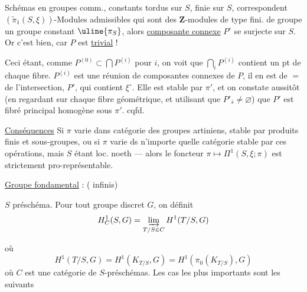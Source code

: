 \uline{} Schémas en groupes comm., constants tordus sur $S$,   finie sur $S$, correspondent  $(\widetilde\pi_1(S,\xi))$-Modules admissibles  qui sont des $\mathbf Z$-modules de type fini.
de groupe un groupe constant $\uline{\pi_S}$, alors  \uline{composante connexe} $P^\circ$ se surjecte sur $S$. Or c'est bien, car $P$ est \uline{trivial} !

Ceci étant, comme $P^{(0)}\subset\bigcap P^{(i)}$ pour  $i$, on voit que $\bigcap_i P^{(i)}$ contient un pt de chaque fibre.      $P^{(i)}$ est une réunion de composantes connexes de $P$, il en est de $=$ de l'intersection,  $P'$, qui contient $\xi^\circ$. Elle est stable par $\pi'$, et on constate aussitôt (en regardant sur chaque fibre géométrique, et utilisant que $P'_{\bar s}\ne\varnothing$) que $P'$ est fibré principal homogène sous $\pi'$.
cqfd.

\uline{Conséquences} Si $\pi$ varie dans catégorie des groupes artiniens,  stable par produits finis et sous-groupes, ou si $\pi$ varie ds n'importe quelle catégorie stable par ces opérations, mais $S$ étant loc. noeth --- alors le foncteur $\pi\mapsto\Pi^1(S,\xi;\pi)$ est strictement pro-représentable.

\uline{Groupe fondamental} : ( infinis)

$S$ préschéma. Pour tout groupe discret $G$, on définit
\[
H^1_C(S,G)=\varinjlim_{T/S\in C}H^1(T/S,G)
\]
\quad
{}

où
\[
H^1(T/S,G)=H^1(K_{T/S},G)=H^1(\pi_0(K_{T/S}),G)
\]
où $C$ est une catégorie de $S$-préschémas.
Les cas les plus importants sont les suivants

